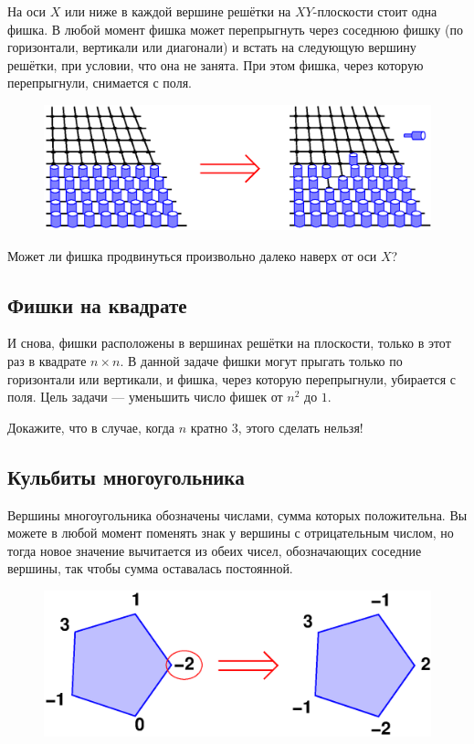 На оси $X$ или ниже в каждой вершине решётки на $XY$-плоскости стоит одна фишка.
В любой момент фишка может перепрыгнуть через соседнюю фишку (по горизонтали, вертикали или диагонали) и встать на следующую вершину решётки, при условии, что она не занята.
При этом фишка, через которую перепрыгнули, снимается с поля.

\begin{figure}[h!]
\centering
\includegraphics[scale=0.6]{Figs/Algorithms/pegs}
\end{figure}

Может ли фишка продвинуться произвольно далеко наверх от оси $X$?

\subsection*{Фишки на квадрате}%

И снова, фишки расположены в вершинах решётки на плоскости, только в этот раз в квадрате $n\times n$.
В данной задаче фишки могут прыгать только по горизонтали или вертикали, и фишка, через которую перепрыгнули, убирается с поля.
Цель задачи --- уменьшить число фишек от $n^2$ до $1$.

Докажите, что в случае, когда $n$ кратно $3$, этого сделать нельзя!

\subsection*{Кульбиты многоугольника}%

Вершины многоугольника обозначены числами, сумма которых положительна.
Вы можете в любой момент поменять знак у вершины с отрицательным числом, но тогда новое значение вычитается из обеих чисел, обозначающих соседние вершины, так чтобы сумма оставалась постоянной.

\begin{figure}[h!]
\centering
\includegraphics[scale=0.6]{Figs/Algorithms/pent}
\end{figure}


